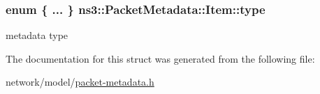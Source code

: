 \subsubsection[{\texorpdfstring{type}{type}}]{\setlength{\rightskip}{0pt plus 5cm}enum \{ ... \}   ns3\+::\+Packet\+Metadata\+::\+Item\+::type}\hypertarget{structns3_1_1PacketMetadata_1_1Item_a76d4fe6402891fd8d840442d51b0f6a0}{}\label{structns3_1_1PacketMetadata_1_1Item_a76d4fe6402891fd8d840442d51b0f6a0}


metadata type 



The documentation for this struct was generated from the following file\+:\begin{DoxyCompactItemize}
\item 
network/model/\hyperlink{packet-metadata_8h}{packet-\/metadata.\+h}\end{DoxyCompactItemize}
